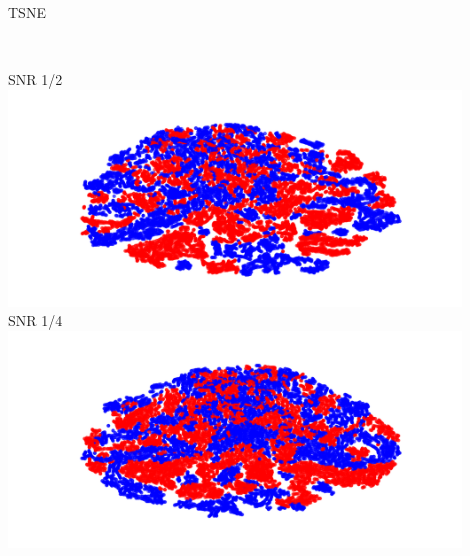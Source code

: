 \documentclass[t, 11pt, xcolor=dvipsnames]{beamer}
\begin{document}
\begin{frame}[fragile]{TSNE}
\begin{center}
\begin{minipage}{0.47\textwidth}
		  \end{minipage}
			~
		  \begin{minipage}{0.47\textwidth}
	          SNR 1/2\\
                  \includegraphics[width=0.9\textwidth]{images/dimredcomps/TSNE_gt_snr1_2.png}\\
		  SNR 1/4\\
                  \includegraphics[width=0.9\textwidth]{images/dimredcomps/TSNE_gt_snr1_4.png}\\
		  \end{minipage}
	\end{center}
\end{frame}
\end{document}
